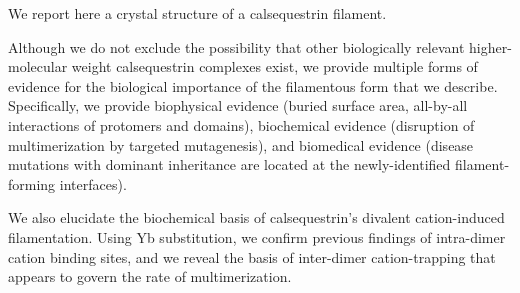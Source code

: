We report here a crystal structure of a calsequestrin filament. \begin{hlbreakable} Although we do not exclude the possibility that other biologically relevant higher-molecular weight calsequestrin complexes exist, we provide multiple forms of evidence for the biological importance of the filamentous form that we describe. Specifically, we provide biophysical evidence (buried surface area, all-by-all interactions of protomers and domains), biochemical evidence (disruption of multimerization by targeted mutagenesis), and biomedical evidence (disease mutations with dominant inheritance are located at the newly-identified filament-forming interfaces). \end{hlbreakable} We also elucidate the biochemical basis of calsequestrin's divalent cation-induced filamentation. Using Yb substitution, we confirm previous findings of intra-dimer cation binding sites, and we reveal the basis of inter-dimer cation-trapping that appears to govern the rate of multimerization. 

